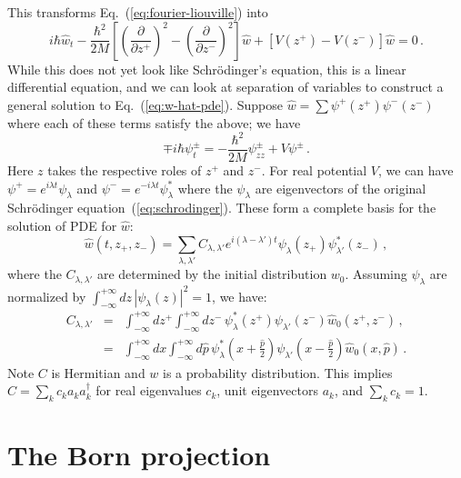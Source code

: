 \documentclass[prb,preprint]{revtex4-1}
\begin{document}
This transforms Eq.~(\ref{eq:fourier-liouville}) into
\begin{equation}\label{eq:w-hat-pde}
i\hbar \hat{w}_t - \frac{\hbar^2}{2M}
\left[\left(\frac{\partial}{\partial z^{+}}\right)^2 - \left(\frac{\partial}{\partial z^{-}}\right)^2\right]\hat{w}
+ [V(z^+) - V(z^-)]\hat{w} = 0 \,.
\end{equation}
While this does not yet look like Schr\"odinger's equation, this is a linear differential
equation, and we can look at separation of variables to construct a general solution
to Eq.~(\ref{eq:w-hat-pde}).
Suppose $\hat{w} = \sum \psi^+(z^+)\psi^-(z^-)$ where each of these terms satisfy the above; we have
\begin{equation}\label{eq:separated}
\mp i\hbar \psi_t^{\pm} = -\frac{\hbar^2}{2M}\psi^{\pm}_{zz} + V\psi^{\pm} \,.
\end{equation}
Here $z$ takes the respective roles of $z^+$ and $z^-$.  For real potential $V$, we can have
$\psi^+ = e^{i\lambda t} \psi_\lambda$ and $\psi^- = e^{-i\lambda t}\psi_\lambda^*$ where the $\psi_\lambda$ are eigenvectors
of the original Schr\"odinger equation~(\ref{eq:schrodinger}).  These form a complete basis for the
solution of PDE for $\hat{w}$:
\begin{equation}\label{eq:w-hat-expansion}
\hat{w}(t,z_+,z_-)=\sum_{\lambda,\lambda'} C_{\lambda,\lambda'} e^{i(\lambda-\lambda')t} \psi_{\lambda}(z_+) \psi^*_{\lambda'}(z_-) \,,
\end{equation}
where the $C_{\lambda,\lambda'}$ are determined by the initial distribution $w_0$.
Assuming $\psi_\lambda$ are normalized by $\int_{-\infty}^{+\infty} dz \, |\psi_\lambda(z)|^2 = 1$, we have:
\begin{eqnarray}
C_{\lambda,\lambda'} &=& \int_{-\infty}^{+\infty} dz^+ \int_{-\infty}^{+\infty} dz^- \, \psi_\lambda^*(z^+) \psi_{\lambda'}(z^-) \hat{w}_0(z^+,z^-) \,, \label{eq:C-z}\\
&=& \int_{-\infty}^{+\infty} dx \int_{-\infty}^{+\infty} d\hat{p} \, \psi_\lambda^*\!\left(x+\frac{\hat{p}}{2}\right) \psi_{\lambda'}\!\left(x-\frac{\hat{p}}{2}\right) \hat{w}_0(x,\hat{p}) \,. \label{eq:C-xp}
\end{eqnarray}
Note $C$ is Hermitian and $w$ is a probability distribution.  This implies $C=\sum_k c_k a_k a_k^\dagger$ for real eigenvalues $c_k$, unit eigenvectors $a_k$, and $\sum_k c_k = 1$.


\section{The Born projection}
\end{document}
